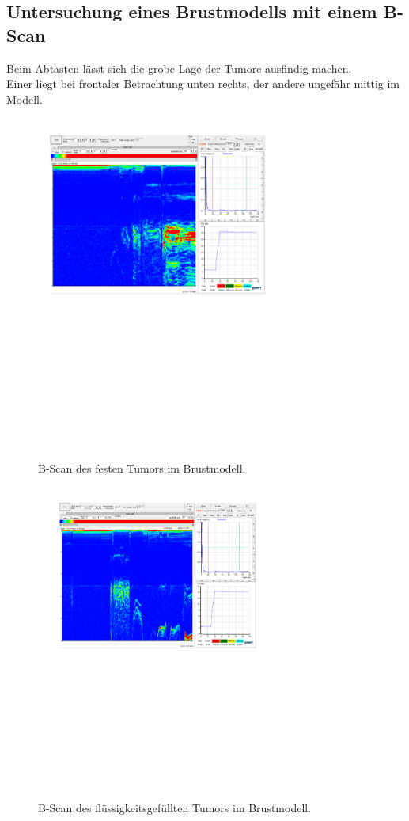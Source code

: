 \subsection{Untersuchung eines Brustmodells mit einem B-Scan}
Beim Abtasten lässt sich die grobe Lage der Tumore ausfindig machen. \\
Einer liegt bei frontaler Betrachtung unten rechts, der andere ungefähr mittig im Modell.

\begin{figure}[H]
  \centering
  \includegraphics[width = 8cm]{content/festtumor.pdf}
  \caption{B-Scan des festen Tumors im Brustmodell.}
  \label{fig:tumorfest}
\end{figure}
\begin{figure}[H]
  \centering
  \includegraphics[width = 8cm]{content/wassertumor.pdf}
  \caption{B-Scan des flüssigkeitsgefüllten Tumors im Brustmodell.}
  \label{fig:tumorfluessig}
\end{figure}